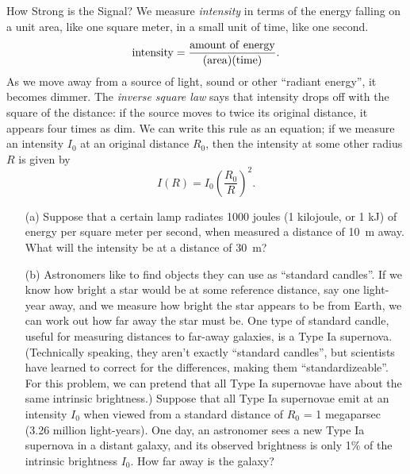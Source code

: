 \documentclass[12pt]{article}
\begin{document}
\begin{probdesc}{2}{How Strong is the Signal?}
We measure {\em intensity} in terms of the energy falling on a unit
area, like one square meter, in a small unit of time, like one
second.
\begin{displaymath}
{\rm intensity} = \frac{\rm amount\ of\ energy}{({\rm area})({\rm
    time})}.
\end{displaymath}
As we move away from a source of light, sound or other ``radiant
energy'', it becomes dimmer.  The {\em inverse square law} says that
intensity drops off with the square of the distance:  if the source
moves to twice its original distance, it appears four times as dim.
We can write this rule as an equation; if we measure an intensity
$I_0$ at an original distance $R_0$, then the intensity at some other
radius $R$ is given by
\begin{equation}
I(R) = I_0 \left(\frac{R_0}{R}\right)^2.
\end{equation}

\begin{enumerate}
\item[(a)] Suppose that a certain lamp radiates 1000 joules (1
  kilojoule, or 1 kJ) of energy per square meter per second, when
  measured a distance of 10~m away.  What will the intensity be at a
  distance of 30~m?

\item[(b)] Astronomers like to find objects they can use as ``standard
  candles''.  If we know how bright a star would be at some reference
  distance, say one light-year away, and we measure how bright the
  star appears to be from Earth, we can work out how far away the star
  must be.  One type of standard candle, useful for measuring
  distances to far-away galaxies, is a Type Ia supernova.
  (Technically speaking, they aren't exactly ``standard candles'', but
  scientists have learned to correct for the differences, making them
  ``standardizeable''.  For this problem, we can pretend that all Type
  Ia supernovae have about the same intrinsic brightness.)  Suppose
  that all Type Ia supernovae emit at an intensity $I_0$ when viewed
  from a standard distance of $R_0$ = 1 megaparsec (3.26 million
  light-years).  One day, an astronomer sees a new Type Ia supernova
  in a distant galaxy, and its observed brightness is only 1\% of the
  intrinsic brightness $I_0$.  How far away is the galaxy?
\end{enumerate}
\end{probdesc}
\end{document}
